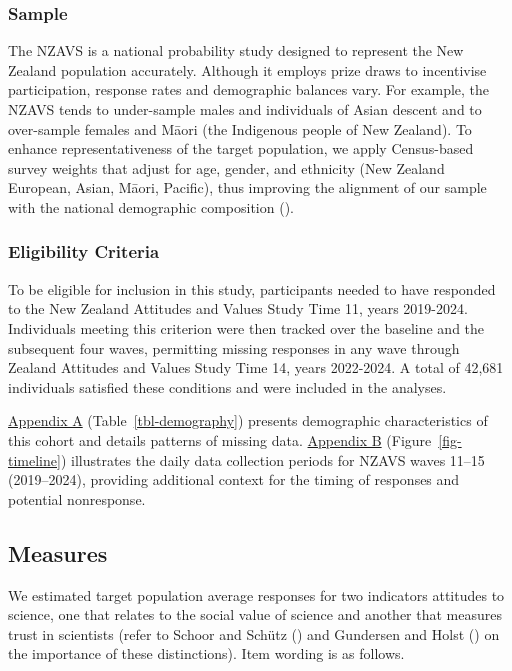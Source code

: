 \documentclass[
  single column]{article}
\begin{document}
\subsubsection{Sample}\label{sample}

The NZAVS is a national probability study designed to represent the New
Zealand population accurately. Although it employs prize draws to
incentivise participation, response rates and demographic balances vary.
For example, the NZAVS tends to under-sample males and individuals of
Asian descent and to over-sample females and Māori (the Indigenous
people of New Zealand). To enhance representativeness of the target
population, we apply Census-based survey weights that adjust for age,
gender, and ethnicity (New Zealand European, Asian, Māori, Pacific),
thus improving the alignment of our sample with the national demographic
composition ().

\subsubsection{Eligibility Criteria}\label{eligibility-criteria}

To be eligible for inclusion in this study, participants needed to have
responded to the New Zealand Attitudes and Values Study Time 11, years
2019-2024. Individuals meeting this criterion were then tracked over the
baseline and the subsequent four waves, permitting missing responses in
any wave through Zealand Attitudes and Values Study Time 14, years
2022-2024. A total of 42,681 individuals satisfied these conditions and
were included in the analyses.

\hyperref[appendix-a]{Appendix A} (Table~\ref{tbl-demography}) presents
demographic characteristics of this cohort and details patterns of
missing data. \hyperref[appendix-b]{Appendix B}
(Figure~\ref{fig-timeline}) illustrates the daily data collection
periods for NZAVS waves 11--15 (2019--2024), providing additional
context for the timing of responses and potential nonresponse.

\subsection{Measures}\label{measures}

We estimated target population average responses for two indicators
attitudes to science, one that relates to the social value of science
and another that measures trust in scientists (refer to Schoor and
Schütz () and Gundersen and Holst
() on the importance of these
distinctions). Item wording is as follows.
\end{document}
